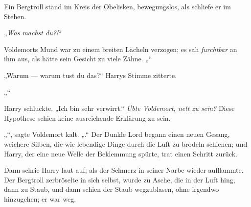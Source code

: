 Ein Bergtroll stand im Kreis der Obelisken, bewegungslos, als schliefe er im Stehen.

„\emph{Was machst du?!}“

Voldemorts Mund war zu einem breiten Lächeln verzogen; es sah \emph{furchtbar} an ihm aus, als hätte sein Gesicht zu viele Zähne.
„“

„Warum — warum tust du das?“ Harrys Stimme zitterte.

„“

Harry schluckte.
„Ich bin sehr verwirrt.“
\emph{Übte Voldemort, nett zu sein?} Diese Hypothese schien keine ausreichende Erklärung zu sein.

„“, sagte Voldemort kalt. „.“
Der Dunkle Lord begann einen neuen Gesang, weichere Silben, die wie lebendige Dinge durch die Luft zu brodeln schienen; und Harry, der eine neue Welle der Beklemmung spürte, trat einen Schritt zurück.

Dann schrie Harry laut auf, als der Schmerz in seiner Narbe wieder aufflammte. Der Bergtroll zerbröselte in sich selbst, wurde zu Asche, die in der Luft hing, dann zu Staub, und dann schien der Staub wegzublasen, ohne irgendwo hinzugehen; er war weg.

